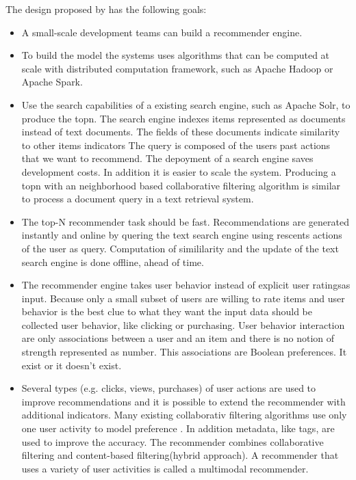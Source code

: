 The design proposed by \cite{Dunning14} has the following goals:
\begin{itemize}
\item A small-scale development teams can build a recommender engine.
\item To build the model the systems uses algorithms that can be computed at scale with distributed computation framework, such as Apache Hadoop or Apache Spark. 
\item Use the search capabilities of a existing search engine, such as Apache Solr, to produce the \gls{topn}. The search engine indexes items represented as documents instead of text documents. The fields of these documents indicate similarity to other items indicators The query is composed of the users past actions that we want to recommend. The depoyment of a search engine saves development costs. In addition it is easier to scale the system. Producing a \gls{topn} with an neighborhood based collaborative filtering algorithm is similar to process a document query in a text retrieval system. 
\item The top-N recommender task should be fast. Recommendations are generated instantly and online by quering the text search engine using rescents actions of the user as query. Computation of simililarity and the update of the text search engine is done offline, ahead of time.
\item The recommender engine takes user behavior instead of explicit user ratingsas input. Because only a small subset of users are willing to rate items and user behavior is the best clue to what they want the input data should be collected user behavior, like clicking or purchasing. User behavior interaction are only associations between a user and an item and there is no notion of strength represented as number. This associations are Boolean preferences. It exist or it doesn't exist. 
\item Several types (e.g. clicks, views, purchases) of user actions are used to improve recommendations and it is possible to extend the recommender with additional \glspl{indicator}. Many existing collaborativ filtering algorithms use only one user activity to model preference \cite{ferrel}. In addition metadata, like tags, are used to improve the accuracy. The recommender combines collaborative filtering and content-based filtering(hybrid approach). A recommender that uses a variety of user activities is called a \gls{multimodal} recommender. 
\end{itemize}

